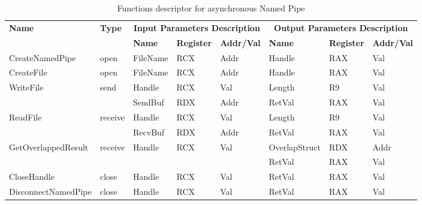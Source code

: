 \begin{table}[H]
  \centering
  \caption{Functions descriptor for asynchronous Named Pipe}
  \label{nameasyn}
\begin{tabular}{|l|l|l|l|l|l|l|l|}
\hline
             \multirow{2}{*}{{\textbf{Name}}} & \multirow{2}{*}{{\textbf{Type}}} & \multicolumn{3}{c|}{\textbf{Input Parameters Description}} & \multicolumn{3}{c|}{\textbf{Output Parameters Description}} \\
              \cline{3-8} 
             & & \textbf{Name}& \textbf{Register} & \textbf{Addr/Val} & \textbf{Name}& \textbf{Register} &  \textbf{Addr/Val}  \\
             \hline
      CreateNamedPipe
       &open & FileName & RCX  & Addr &  Handle & RAX & Val\\
      \hline         
      CreateFile
       &open & FileName & RCX & Addr&  Handle & RAX & Val\\ 
      \hline              
      \multirow{2}{*}{WriteFile}
       &\multirow{2}{*}{send} &  Handle & RCX & Val & Length & R9 & Val\\
        \cline{3-8} 
       & & SendBuf & RDX & Addr & RetVal& RAX & Val\\
      \hline            
      \multirow{2}{*}{ReadFile}
       &\multirow{2}{*}{receive} &  Handle & RCX & Val& Length & R9 & Val\\
        \cline{3-8} 
       & & RecvBuf & RDX  & Addr & RetVal& RAX & Val\\
      \hline    
           \multirow{2}{*}{GetOverlappedResult} &
       \multirow{2}{*}{receive} &  \multirow{2}{*}{Handle} & \multirow{2}{*}{RCX} & \multirow{2}{*}{Val} &OverlapStruct &RDX & Addr\\
               \cline{6-8} 
       & &  &   &  & RetVal& RAX & Val\\
      \hline     
      CloseHandle &
       close &  Handle & RCX & Val & RetVal& RAX & Val\\
      \hline            
      DisconnectNamedPipe &
      close &  Handle & RCX & Val & RetVal& RAX & Val\\
      \hline               
  \end{tabular}  
\end{table}

